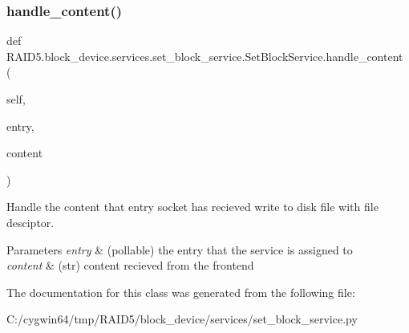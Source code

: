 \subsubsection{\texorpdfstring{handle\+\_\+content()}{handle\_content()}}
{\footnotesize\ttfamily def R\+A\+I\+D5.\+block\+\_\+device.\+services.\+set\+\_\+block\+\_\+service.\+Set\+Block\+Service.\+handle\+\_\+content (\begin{DoxyParamCaption}\item[{}]{self,  }\item[{}]{entry,  }\item[{}]{content }\end{DoxyParamCaption})}



Handle the content that entry socket has recieved write to disk file with file desciptor. 


\begin{DoxyParams}{Parameters}
{\em entry} & (pollable) the entry that the service is assigned to \\
\hline
{\em content} & (str) content recieved from the frontend \\
\hline
\end{DoxyParams}


The documentation for this class was generated from the following file\+:\begin{DoxyCompactItemize}
\item 
C\+:/cygwin64/tmp/\+R\+A\+I\+D5/block\+\_\+device/services/set\+\_\+block\+\_\+service.\+py\end{DoxyCompactItemize}

